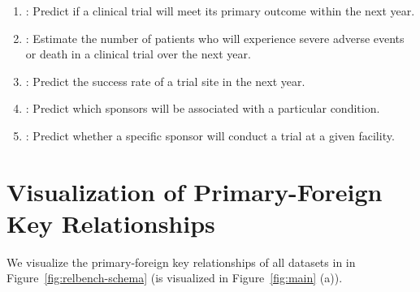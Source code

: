 \documentclass{article}
\theoremstyle{plain}
\theoremstyle{definition}
\theoremstyle{remark}
\begin{document}
\begin{enumerate}
    \begin{enumerate}
    \item \studyOutcome: Predict if a clinical trial will meet its primary outcome within the next year.
    \item \studyAdverse: Estimate the number of patients who will experience severe adverse events or death in a clinical trial over the next year.
    \item \facilitySuccess: Predict the success rate of a trial site in the next year.
    \item \sponsorConditionRec: Predict which sponsors will be associated with a particular condition.
    \item \sponsorFacilityRec: Predict whether a specific sponsor will conduct a trial at a given facility.
    \end{enumerate}
    

\end{enumerate}





\section{Visualization of Primary-Foreign Key Relationships}
\label{app: vis}

We visualize the primary-foreign key relationships of all datasets in \relbench in Figure~\ref{fig:relbench-schema} (\fone is visualized in Figure~\ref{fig:main} (a)).
\end{document}
